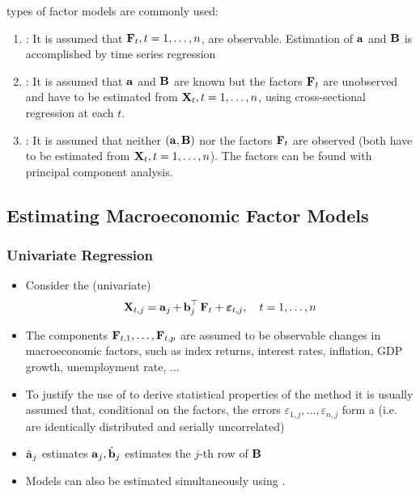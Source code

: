  types of factor models are commonly used:
\begin{enumerate}[label = (\arabic*), leftmargin=*]
    \item {}:
It is assumed that $\boldsymbol{\mathbf{F}}_{t}, t=1, \ldots, n$, are observable. Estimation of $\operatorname{\boldsymbol{\mathbf{a}}}$ and $\operatorname{\boldsymbol{\mathbf{B}}}$ is accomplished by time series regression
    \item {}:
It is assumed that $\operatorname{\boldsymbol{\mathbf{a}}}$ and $\operatorname{\boldsymbol{\mathbf{B}}}$ are known but the factors $\boldsymbol{\mathbf{F}}_{t}$ are unobserved and have to be estimated from $\operatorname{\boldsymbol{\mathbf{X}}}_{t}, t=1, \ldots, n$, using cross-sectional regression at each $t$.
    \item {}:
It is assumed that neither $(\operatorname{\boldsymbol{\mathbf{a}}}, \operatorname{\boldsymbol{\mathbf{B}}})$ nor the factors $\boldsymbol{\mathbf{F}}_{t}$ are observed (both have to be estimated from $\operatorname{\boldsymbol{\mathbf{X}}}_{t}, t=1, \ldots, n$). The factors can be found with principal component analysis.
\end{enumerate}






\subsection*{Estimating Macroeconomic Factor Models}
\subsubsection*{Univariate Regression}
\begin{itemize}[leftmargin=*]
    \item Consider the (univariate) 
$$
\operatorname{\boldsymbol{\mathbf{X}}}_{t, j}=\operatorname{\boldsymbol{\mathbf{a}}}_{j}+\operatorname{\boldsymbol{\mathbf{b}}}_{j}^{\operatorname{\top}} \boldsymbol{\mathbf{F}}_{t}+ \boldsymbol{\mathbf{\varepsilon}}_{t, j}, \quad t=1, \ldots, n
$$
    \item The components $\boldsymbol{\mathbf{F}}_{t, 1}, \ldots, \boldsymbol{\mathbf{F}}_{t, p}$ are assumed to be observable changes in macroeconomic factors, such as index returns, interest rates, inflation, GDP growth, unemployment rate, ...
    \item To justify the use of  to derive statistical properties of the method it is usually assumed that, conditional on the factors, the errors $\varepsilon_{1, j}, \ldots, \varepsilon_{n, j}$ form a  (i.e. are identically distributed and serially uncorrelated)
    \item $\hat{\operatorname{\boldsymbol{\mathbf{a}}}}_{j}$ estimates $\operatorname{\boldsymbol{\mathbf{a}}}_{j}, \hat{\operatorname{\boldsymbol{\mathbf{b}}}}_{j}$ estimates the $j$-th row of $\operatorname{\boldsymbol{\mathbf{B}}}$
    \item Models can also be estimated simultaneously using .
\end{itemize}





